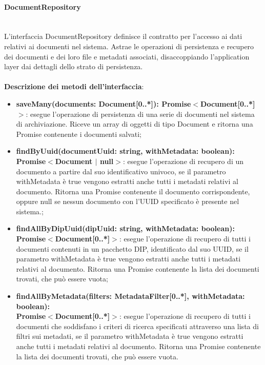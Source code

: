 \documentclass[a4paper,12pt]{article}
\begin{document}
{{{                \paragraph{DocumentRepository}\label{par:DocumentRepository}\mbox{}\\
                L'interfaccia DocumentRepository definisce il contratto per l'accesso ai dati relativi ai documenti nel sistema. Astrae le operazioni di persistenza e recupero dei documenti e dei loro file e metadati associati, disaccoppiando l'application layer dai dettagli dello strato di persistenza.\\
                \\
              \noindent \textbf{Descrizione dei metodi dell'interfaccia}:
                \begin{itemize}
                    \item \textbf{saveMany(documents: Document[0..*]): Promise$<$Document[0..*]$>$}: esegue l'operazione di persistenza di una serie di documenti nel sistema di archiviazione. Riceve un array di oggetti di tipo Document e ritorna una Promise contenente i documenti salvati;
                    \item \textbf{findByUuid(documentUuid: string, withMetadata: boolean):\\ Promise$<$Document $|$ null$>$}: esegue l'operazione di recupero di un documento a partire dal suo identificativo univoco, se il parametro withMetadata è true vengono estratti anche tutti i metadati relativi al documento. Ritorna una Promise contenente il documento corrispondente, oppure null se nessun documento con l'UUID specificato è presente nel sistema.;
                    \item \textbf{findAllByDipUuid(dipUuid: string, withMetadata: boolean):\\ Promise$<$Document[0..*]$>$}: esegue l'operazione di recupero di tutti i documenti contenuti in un pacchetto DIP, identificato dal suo UUID, se il parametro withMetadata è true vengono estratti anche tutti i metadati relativi al documento. Ritorna una Promise contenente la lista dei documenti trovati, che può essere vuota;
                    \item \textbf{findAllByMetadata(filters: MetadataFilter[0..*], withMetadata: boolean):\\ Promise$<$Document[0..*]$>$}: esegue l'operazione di recupero di tutti i documenti che soddisfano i criteri di ricerca specificati attraverso una lista di filtri sui metadati, se il parametro withMetadata è true vengono estratti anche tutti i metadati relativi al documento. Ritorna una Promise contenente la lista dei documenti trovati, che può essere vuota.
                \end{itemize}
}}}
\end{document}
